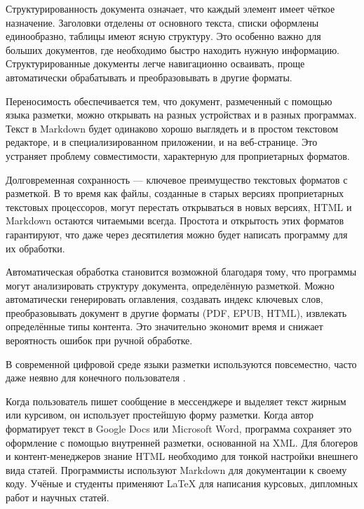 \documentclass{SibFU-docs}
\begin{document}
Структурированность документа означает, что каждый элемент имеет чёткое назначение. Заголовки отделены от основного текста, списки оформлены единообразно, таблицы имеют ясную структуру. Это особенно важно для больших документов, где необходимо быстро находить нужную информацию. Структурированные документы легче навигационно осваивать, проще автоматически обрабатывать и преобразовывать в другие форматы.

Переносимость обеспечивается тем, что документ, размеченный с помощью языка разметки, можно открывать на разных устройствах и в разных программах. Текст в Markdown будет одинаково хорошо выглядеть и в простом текстовом редакторе, и в специализированном приложении, и на веб-странице. Это устраняет проблему совместимости, характерную для проприетарных форматов.

Долговременная сохранность — ключевое преимущество текстовых форматов с разметкой. В то время как файлы, созданные в старых версиях проприетарных текстовых процессоров, могут перестать открываться в новых версиях, HTML и Markdown остаются читаемыми всегда. Простота и открытость этих форматов гарантируют, что даже через десятилетия можно будет написать программу для их обработки.

Автоматическая обработка становится возможной благодаря тому, что программы могут анализировать структуру документа, определённую разметкой. Можно автоматически генерировать оглавления, создавать индекс ключевых слов, преобразовывать документ в другие форматы (PDF, EPUB, HTML), извлекать определённые типы контента. Это значительно экономит время и снижает вероятность ошибок при ручной обработке.


В современной цифровой среде языки разметки используются повсеместно, часто даже неявно для конечного пользователя \cite{bernerslee2001semanticweb, dublincore}.

Когда пользователь пишет сообщение в мессенджере и выделяет текст жирным или курсивом, он использует простейшую форму разметки. Когда автор форматирует текст в Google Docs или Microsoft Word, программа сохраняет это оформление с помощью внутренней разметки, основанной на XML. Для блогеров и контент-менеджеров знание HTML необходимо для тонкой настройки внешнего вида статей. Программисты используют Markdown для документации к своему коду. Учёные и студенты применяют LaTeX для написания курсовых, дипломных работ и научных статей.
\end{document}
